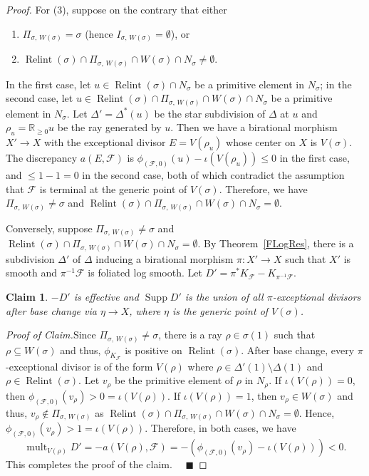 \documentclass[12pt,reqno]{amsart}
\newtheorem*{claim}{Claim}
\theoremstyle{definition}
\newcommand{\on}{\operatorname}
\newenvironment{claimproof}[1]{\par\noindent\emph{Proof of Claim.}\space#1}{}
\newcommand\cF{{\mathcal{F}}}
\newcommand\bR{{\mathbb R}}
\begin{document}
\begin{proof}
    For (3), suppose on the contrary that either
    \begin{enumerate}
        \item $\Pi_{\sigma,\,W(\sigma)}=\sigma$ (hence $I_{\sigma,\,W(\sigma)}=\emptyset$), or 
        \item $\on{Relint}(\sigma)\cap\Pi_{\sigma,\,W(\sigma)}\cap W(\sigma)\cap N_\sigma\neq\emptyset$. 
    \end{enumerate}
    In the first case, let $u\in \on{Relint}(\sigma)\cap N_\sigma$ be a primitive element in $N_\sigma$; in the second case, let $u\in\on{Relint}(\sigma)\cap\Pi_{\sigma,\,W(\sigma)}\cap W(\sigma)\cap N_\sigma$ be a primitive element in $N_\sigma$. 
    Let $\Delta'=\Delta^*(u)$ be the star subdivision of $\Delta$ at $u$ and $\rho_u=\bR_{\geq 0}u$ be the ray generated by $u$. 
    Then we have a birational morphism $X'\to X$ with the exceptional divisor $E=V(\rho_u)$ whose center on $X$ is $V(\sigma)$. The discrepancy $a(E,\cF)$ is $\phi_{(\cF,0)}(u)-\iota(V(\rho_u))\leq 0$ in the first case, and $\leq 1-1=0$ in the second case, both of which contradict the assumption that $\cF$ is terminal at the generic point of $V(\sigma)$. 
    Therefore, we have $\Pi_{\sigma,\,W(\sigma)}\neq\sigma$ and $\on{Relint}(\sigma)\cap\Pi_{\sigma,\,W(\sigma)}\cap W(\sigma)\cap N_\sigma=\emptyset$. 

    Conversely, suppose $\Pi_{\sigma,\,W(\sigma)}\neq\sigma$ and $\on{Relint}(\sigma)\cap\Pi_{\sigma,\,W(\sigma)}\cap W(\sigma)\cap N_\sigma=\emptyset$. 
    By Theorem~\ref{FLogRes}, there is a subdivision $\Delta'$ of $\Delta$ inducing a birational morphism $\pi\colon X'\to X$ such that $X'$ is smooth and $\pi^{-1}\cF$ is foliated log smooth.  
    Let $D' = \pi^*K_{\cF} - K_{\pi^{-1}\cF}$. 
    \begin{claim}
        $-D'$ is effective and $\on{Supp}D'$ is the union of all $\pi$-exceptional divisors after base change via $\eta\to X$, where $\eta$ is the generic point of $V(\sigma)$. 
    \end{claim}
    \begin{claimproof}
        Since $\Pi_{\sigma,\,W(\sigma)}\neq\sigma$, there is a ray $\rho\in\sigma(1)$ such that $\rho\subseteq W(\sigma)$ and thus, $\phi_{K_{\cF}}$ is positive on $\on{Relint}(\sigma)$. After base change, every $\pi$-exceptional divisor is of the form $V(\rho)$ where $\rho\in\Delta'(1)\setminus\Delta(1)$ and $\rho\in\on{Relint}(\sigma)$. Let $v_\rho$ be the primitive element of $\rho$ in $N_\rho$. 
        If $\iota(V(\rho))=0$, then $\phi_{(\cF,0)}(v_\rho)>0=\iota(V(\rho))$. 
        If $\iota(V(\rho))=1$, then $v_\rho\in W(\sigma)$ and thus, $v_\rho\notin\Pi_{\sigma,\,W(\sigma)}$ as $\on{Relint}(\sigma)\cap\Pi_{\sigma,\,W(\sigma)}\cap W(\sigma)\cap N_\sigma=\emptyset$. 
        Hence, $\phi_{(\cF,0)}(v_\rho)>1=\iota(V(\rho))$. 
        Therefore, in both cases, we have 
        \[\on{mult}_{V(\rho)}D' = -a(V(\rho),\cF) = -(\phi_{(\cF,0)}(v_\rho) - \iota(V(\rho)))< 0.\] 
        This completes the proof of the claim. $\quad\blacksquare$
    \end{claimproof}
        

\end{proof}
\end{document}
